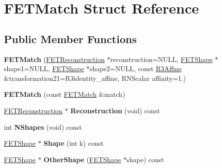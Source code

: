 \hypertarget{struct_f_e_t_match}{}\section{F\+E\+T\+Match Struct Reference}
\label{struct_f_e_t_match}
\subsection*{Public Member Functions}
\begin{DoxyCompactItemize}
\item 
{\bfseries F\+E\+T\+Match} (\hyperlink{struct_f_e_t_reconstruction}{F\+E\+T\+Reconstruction} $\ast$reconstruction=N\+U\+LL, \hyperlink{struct_f_e_t_shape}{F\+E\+T\+Shape} $\ast$shape1=N\+U\+LL, \hyperlink{struct_f_e_t_shape}{F\+E\+T\+Shape} $\ast$shape2=N\+U\+LL, const \hyperlink{class_r3_affine}{R3\+Affine} \&transformation21=R3identity\+\_\+affine, R\+N\+Scalar affinity=1.)\hypertarget{struct_f_e_t_match_a7dd9d32acf46dbca3759267c395fc98f}{}\label{struct_f_e_t_match_a7dd9d32acf46dbca3759267c395fc98f}

\item 
{\bfseries F\+E\+T\+Match} (const \hyperlink{struct_f_e_t_match}{F\+E\+T\+Match} \&match)\hypertarget{struct_f_e_t_match_a6f862d7d2f535fcdb122411846b25165}{}\label{struct_f_e_t_match_a6f862d7d2f535fcdb122411846b25165}

\item 
\hyperlink{struct_f_e_t_reconstruction}{F\+E\+T\+Reconstruction} $\ast$ {\bfseries Reconstruction} (void) const \hypertarget{struct_f_e_t_match_aa86a04536d1730e105a2cf64f484ca35}{}\label{struct_f_e_t_match_aa86a04536d1730e105a2cf64f484ca35}

\item 
int {\bfseries N\+Shapes} (void) const \hypertarget{struct_f_e_t_match_a4d12628a552723aa1ecb0c56d772abea}{}\label{struct_f_e_t_match_a4d12628a552723aa1ecb0c56d772abea}

\item 
\hyperlink{struct_f_e_t_shape}{F\+E\+T\+Shape} $\ast$ {\bfseries Shape} (int k) const \hypertarget{struct_f_e_t_match_a4cc47953327ae1ebcfe9ce3c1de02bc0}{}\label{struct_f_e_t_match_a4cc47953327ae1ebcfe9ce3c1de02bc0}

\item 
\hyperlink{struct_f_e_t_shape}{F\+E\+T\+Shape} $\ast$ {\bfseries Other\+Shape} (\hyperlink{struct_f_e_t_shape}{F\+E\+T\+Shape} $\ast$shape) const \hypertarget{struct_f_e_t_match_ae641b0e6bdebbb8e324d3081e7ff834f}{}\label{struct_f_e_t_match_ae641b0e6bdebbb8e324d3081e7ff834f}


\end{DoxyCompactItemize}
